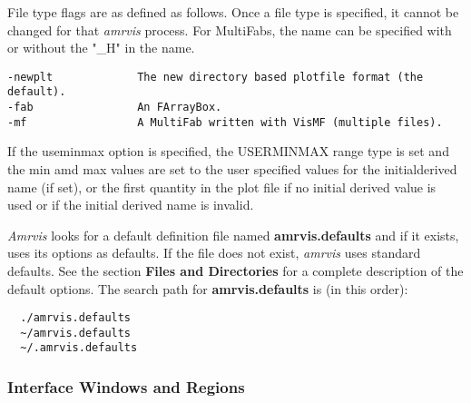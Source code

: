 \documentclass{article}
\begin{document}
File type flags are as defined as follows.  Once a file type is specified,
it cannot be changed for that {\em amrvis} process.  For MultiFabs,
the name can be specified with or without the "\_H" in the name.

\begin{verbatim}
-newplt             The new directory based plotfile format (the default).
-fab                An FArrayBox.
-mf                 A MultiFab written with VisMF (multiple files).
\end{verbatim}

If the useminmax option is specified, the USERMINMAX range type is
set and the min amd max values are set to the user specified values
for the initialderived name (if set), or the first quantity in the
plot file if no initial derived value is used or if the initial derived
name is invalid.

{\em Amrvis} looks for a default definition file named  {\bf amrvis.defaults}
and if it exists, uses its options as defaults.
If the file does not exist, {\em amrvis} uses standard defaults.
See the section {\bf Files and Directories} for a complete description
of the default options.
The search path for {\bf amrvis.defaults} is (in this order):

\begin{verbatim}
  ./amrvis.defaults
  ~/amrvis.defaults
  ~/.amrvis.defaults
\end{verbatim}



\subsubsection{Interface Windows and Regions}
\end{document}
